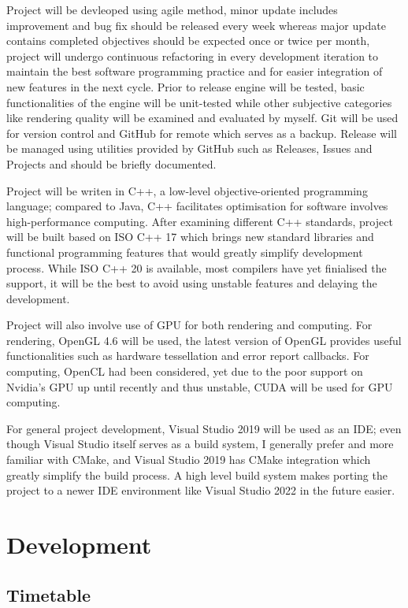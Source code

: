 \documentclass[oneside, a4paper]{article}
\begin{document}
    Project will be devleoped using agile method, minor update includes improvement and bug fix should be released every week whereas major update contains completed objectives should be expected once or twice per month, project will undergo continuous refactoring in every development iteration to maintain the best software programming practice and for easier integration of new features in the next cycle. Prior to release engine will be tested, basic functionalities of the engine will be unit-tested while other subjective categories like rendering quality will be examined and evaluated by myself. Git will be used for version control and GitHub for remote which serves as a backup. Release will be managed using utilities provided by GitHub such as Releases, Issues and Projects and should be briefly documented.

    Project will be writen in C++, a low-level objective-oriented programming language; compared to Java, C++ facilitates optimisation for software involves high-performance computing. After examining different C++ standards, project will be built based on ISO C++ 17 which brings new standard libraries and functional programming features that would greatly simplify development process. While ISO C++ 20 is available, most compilers have yet finialised the support, it will be the best to avoid using unstable features and delaying the development.

    Project will also involve use of GPU for both rendering and computing. For rendering, OpenGL 4.6 will be used, the latest version of OpenGL provides useful functionalities such as hardware tessellation and error report callbacks. For computing, OpenCL had been considered, yet due to the poor support on Nvidia's GPU up until recently and thus unstable, CUDA will be used for GPU computing.

    For general project development, Visual Studio 2019 will be used as an IDE; even though Visual Studio itself serves as a build system, I generally prefer and more familiar with CMake, and Visual Studio 2019 has CMake integration which greatly simplify the build process. A high level build system makes porting the project to a newer IDE environment like Visual Studio 2022 in the future easier.

    \section{Development}

    \subsection{Timetable}
\end{document}

